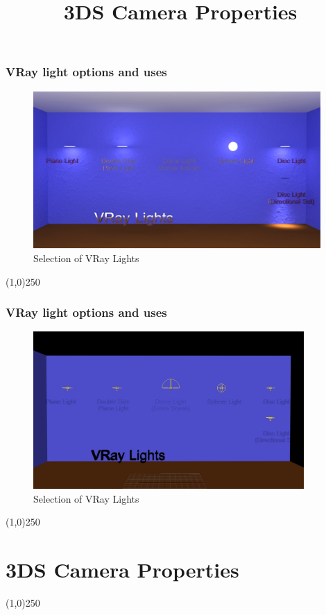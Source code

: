 \begin{frame}
\frametitle{VRay light options and uses}
\begin{figure}
	\centering
	\includegraphics[height=6.0cm]{./Lights/VRayLights}
	\caption{Selection of VRay Lights}
	\label{fig:SelectionofLights}
\end{figure}
\end{frame}
\begin{center}\line(1,0){250}\end{center}


\begin{frame}
\frametitle{VRay light options and uses}
\begin{figure}
	\centering
	\includegraphics[height=6.0cm]{./Lights/VRayLightsDialog}
	\caption{Selection of VRay Lights}
	\label{fig:SelectionofLightsSetup}
\end{figure}
\end{frame}
\begin{center}\line(1,0){250}\end{center}











\section{3DS Camera Properties}
\begin{frame}
\title[3DS Camera Properties]{3DS Camera Properties}
\titlepage
\end{frame}\begin{center}\line(1,0){250}\end{center}

